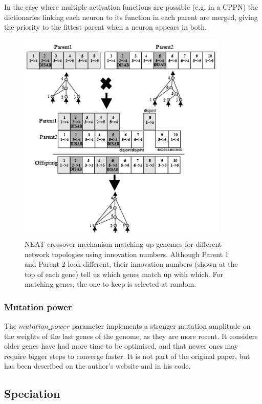In the case where multiple activation functions are possible (e.g. in a CPPN) the dictionaries linking each neuron to its function in each parent are merged, giving the priority to the fittest parent when a neuron appears in both. 

\begin{figure}[H]
\centering
\captionsetup{justification=centering,margin=2cm}
\includegraphics[width=10cm]{images/neat_cros.png}
\caption{NEAT crossover mechanism matching  up  genomes  for  different  network  topologies  using  innovation numbers.   Although  Parent 1  and  Parent 2  look  different,  their  innovation  numbers (shown at the top of each gene) tell us which genes match up with which. For matching genes, the one to keep is selected at random. \cite{NEAT_2}}
 \label{fig:neat-cros}
\end{figure}

\subsubsection{Mutation power}

The $mutation\_power$ parameter implements a stronger mutation amplitude on the weights of the last genes of the genome, as they are more recent. It considers older genes have had more time to be optimised, and that newer ones may require bigger steps to converge faster. It is not part of the original paper, but has been described on the author's website and in his code.

\subsection{Speciation}

